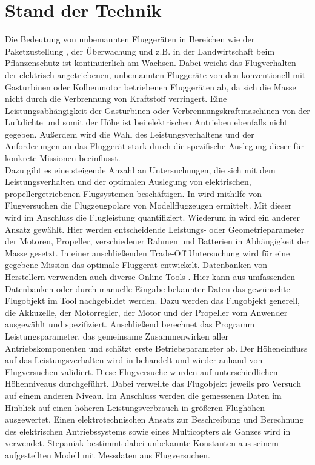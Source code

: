 \section{Stand der Technik}
\label{sec:stand_der_technik}
Die Bedeutung von unbemannten Fluggeräten in Bereichen wie der Paketzustellung \cite{amazon}, der Überwachung \cite{polizei} und z.B. in der Landwirtschaft beim Pflanzenschutz \cite{landwirtschaft} ist kontinuierlich am Wachsen. Dabei weicht das Flugverhalten der elektrisch angetriebenen, unbemannten Fluggeräte von den konventionell mit Gasturbinen oder Kolbenmotor betriebenen Fluggeräten ab, da sich die Masse nicht durch die Verbrennung von Kraftstoff verringert. Eine Leistungsabhängigkeit der Gasturbinen oder Verbrennungskraftmaschinen von der Luftdichte und somit der Höhe ist bei elektrischen Antrieben ebenfalls nicht gegeben. Außerdem wird die Wahl des Leistungsverhaltens und der Anforderungen an das Fluggerät stark durch die spezifische Auslegung dieser für konkrete Missionen beeinflusst. \\
Dazu gibt es eine steigende Anzahl an Untersuchungen, die sich mit dem Leistungsverhalten und der optimalen Auslegung von elektrischen, propellergetriebenen Flugsystemen beschäftigen. In \cite{Ostler.2006} wird mithilfe von Flugversuchen die Flugzeugpolare von Modellflugzeugen ermittelt. Mit dieser wird im Anschluss die Flugleistung quantifiziert. Wiederum in \cite{KARI.2017} wird ein anderer Ansatz gewählt. Hier werden entscheidende Leistungs- oder Geometrieparameter der Motoren, Propeller, verschiedener Rahmen und Batterien in Abhängigkeit der Masse gesetzt. In einer anschließenden Trade-Off Untersuchung wird für eine gegebene Mission das optimale Fluggerät entwickelt. Datenbanken von Herstellern verwenden auch diverse Online Tools \cite{Drivecalc,eCalc,Flyeval}. Hier kann aus umfassenden Datenbanken oder durch manuelle Eingabe bekannter Daten das gewünschte Flugobjekt im Tool nachgebildet werden. Dazu werden das Flugobjekt generell, die Akkuzelle, der Motorregler, der Motor und der Propeller vom Anwender ausgewählt und spezifiziert. Anschließend berechnet das Programm Leistungsparameter, das gemeinsame Zusammenwirken aller Antriebskomponenten und schätzt erste Betriebsparameter ab. Der Höheneinfluss auf das Leistungsverhalten wird in \cite{PCUP.2017} behandelt und wieder anhand von Flugversuchen validiert. Diese Flugversuche wurden auf unterschiedlichen Höhenniveaus durchgeführt. Dabei verweilte das Flugobjekt jeweils pro Versuch auf einem anderen Niveau. Im Anschluss werden die gemessenen Daten im Hinblick auf einen höheren Leistungsverbrauch in größeren Flughöhen ausgewertet. Einen elektrotechnischen Ansatz zur Beschreibung und Berechnung des elektrischen Antriebssystems sowie eines Multicopters als Ganzes wird in \cite{Quan.2017,Shi.2017,Stepaniak.2009} verwendet. Stepaniak bestimmt dabei unbekannte Konstanten aus seinem aufgestellten Modell mit Messdaten aus Flugversuchen. \\
